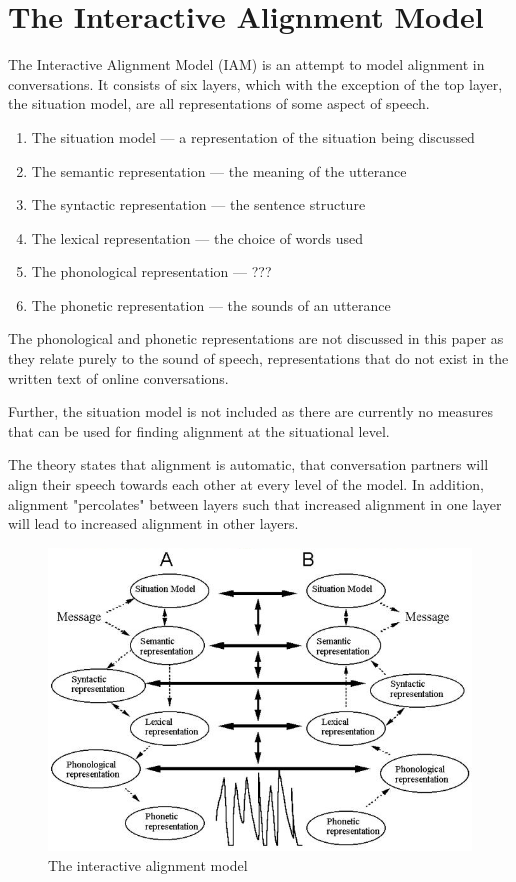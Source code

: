 \documentclass[conference]{IEEEtran}
\begin{document}
{\section{The Interactive Alignment Model}
The Interactive Alignment Model (IAM)\cite{pickering2004toward} is an attempt to model alignment in
conversations. It consists of six layers, which with the exception of the top layer, the situation
model, are all representations of some aspect of speech.

\begin{enumerate}
	\item The situation model --- a representation of the situation being discussed
	\item The semantic representation --- the meaning of the utterance
	\item The syntactic representation --- the sentence structure
	\item The lexical representation --- the choice of words used
	\item The phonological representation --- ???
	\item The phonetic representation --- the sounds of an utterance
\end{enumerate}

The phonological and phonetic representations are not discussed in this paper as they relate purely
to the sound of speech, representations that do not exist in the written text of online conversations.

Further, the situation model is not included as there are currently no measures that can be used for
finding alignment at the situational level.

The theory states that alignment is automatic, that conversation partners will align their speech 
towards each other at every level of the model. In addition, alignment "percolates" between layers such
that increased alignment in one layer will lead to increased alignment in other layers.

\begin{figure}
	\caption{The interactive alignment model}
	\includegraphics[width=\textwidth]{iam}
\end{figure}


}
\end{document}
